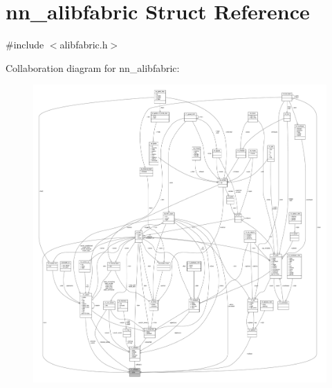 \hypertarget{structnn__alibfabric}{}\section{nn\+\_\+alibfabric Struct Reference}
\label{structnn__alibfabric}


{\ttfamily \#include $<$alibfabric.\+h$>$}



Collaboration diagram for nn\+\_\+alibfabric\+:\nopagebreak
\begin{figure}[H]
\begin{center}
\leavevmode
\includegraphics[width=350pt]{structnn__alibfabric__coll__graph}
\end{center}
\end{figure}

